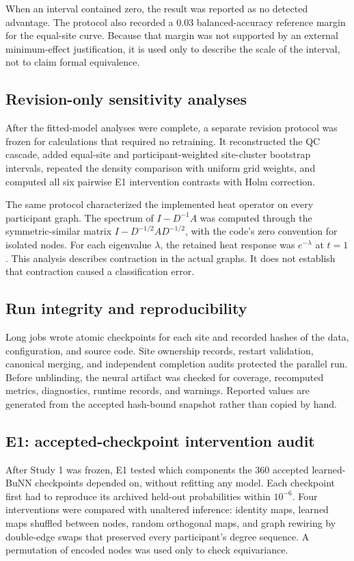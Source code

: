 \documentclass[11pt,a4paper]{article}
\begin{document}
When an interval contained zero, the result was reported as no detected
advantage. The protocol also recorded a 0.03 balanced-accuracy reference
margin for the equal-site curve. Because that margin was not supported by an
external minimum-effect justification, it is used only to describe the scale
of the interval, not to claim formal equivalence.

\subsection{Revision-only sensitivity analyses}

After the fitted-model analyses were complete, a separate revision protocol
was frozen for calculations that required no retraining. It reconstructed the
QC cascade, added equal-site and participant-weighted site-cluster bootstrap
intervals, repeated the density comparison with uniform grid weights, and
computed all six pairwise E1 intervention contrasts with Holm correction.

The same protocol characterized the implemented heat operator on every
participant graph. The spectrum of $I-D^{-1}A$ was computed through the
symmetric-similar matrix $I-D^{-1/2}AD^{-1/2}$, with the code's zero convention
for isolated nodes. For each eigenvalue $\lambda$, the retained heat response
was $e^{-\lambda}$ at $t=1$. This analysis describes contraction in the actual
graphs. It does not establish that contraction caused a classification error.

\subsection{Run integrity and reproducibility}

Long jobs wrote atomic checkpoints for each site and recorded hashes of the
data, configuration, and source code. Site ownership records, restart
validation, canonical merging, and independent completion audits protected the
parallel run. Before unblinding, the neural artifact was checked for coverage,
recomputed metrics, diagnostics, runtime records, and warnings. Reported values
are generated from the accepted hash-bound snapshot rather than copied by hand.

\subsection{E1: accepted-checkpoint intervention audit}

After Study 1 was frozen, E1 tested which components the 360 accepted
learned-BuNN checkpoints depended on, without refitting any model. Each
checkpoint first had to reproduce its archived held-out probabilities within
$10^{-6}$. Four interventions were compared with unaltered inference: identity
maps, learned maps shuffled between nodes, random orthogonal maps, and graph
rewiring by double-edge swaps that preserved every participant's degree
sequence. A permutation of encoded nodes was used only to check equivariance.
\end{document}
